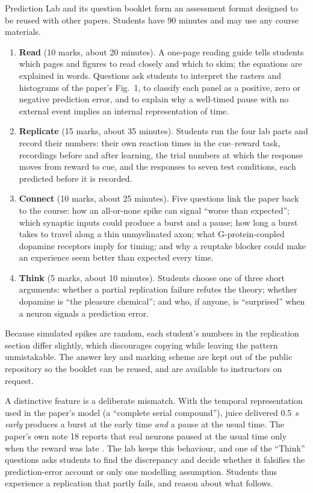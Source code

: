 \documentclass[11pt,a4paper]{article}
\begin{document}
Prediction Lab and its question booklet form an assessment format designed to be reused with other papers. Students have 90 minutes and may use any course materials.

\begin{enumerate}
\item \textbf{Read} (10 marks, about 20 minutes). A one-page reading guide tells students which pages and figures to read closely and which to skim; the equations are explained in words. Questions ask students to interpret the rasters and histograms of the paper's Fig.~1, to classify each panel as a positive, zero or negative prediction error, and to explain why a well-timed pause with no external event implies an internal representation of time.
\item \textbf{Replicate} (15 marks, about 35 minutes). Students run the four lab parts and record their numbers: their own reaction times in the cue--reward task, recordings before and after learning, the trial numbers at which the response moves from reward to cue, and the responses to seven test conditions, each predicted before it is recorded.
\item \textbf{Connect} (10 marks, about 25 minutes). Five questions link the paper back to the course: how an all-or-none spike can signal ``worse than expected''; which synaptic inputs could produce a burst and a pause; how long a burst takes to travel along a thin unmyelinated axon; what G-protein-coupled dopamine receptors imply for timing; and why a reuptake blocker could make an experience seem better than expected every time.
\item \textbf{Think} (5 marks, about 10 minutes). Students choose one of three short arguments: whether a partial replication failure refutes the theory; whether dopamine is ``the pleasure chemical''; and who, if anyone, is ``surprised'' when a neuron signals a prediction error.
\end{enumerate}

Because simulated spikes are random, each student's numbers in the replication section differ slightly, which discourages copying while leaving the pattern unmistakable. The answer key and marking scheme are kept out of the public repository so the booklet can be reused, and are available to instructors on request.

A distinctive feature is a deliberate mismatch. With the temporal representation used in the paper's model (a ``complete serial compound''), juice delivered 0.5~s \emph{early} produces a burst at the early time \emph{and} a pause at the usual time. The paper's own note 18 reports that real neurons paused at the usual time only when the reward was late \citep[see also][]{hollerman1998}. The lab keeps this behaviour, and one of the ``Think'' questions asks students to find the discrepancy and decide whether it falsifies the prediction-error account or only one modelling assumption. Students thus experience a replication that partly fails, and reason about what follows.
\end{document}
